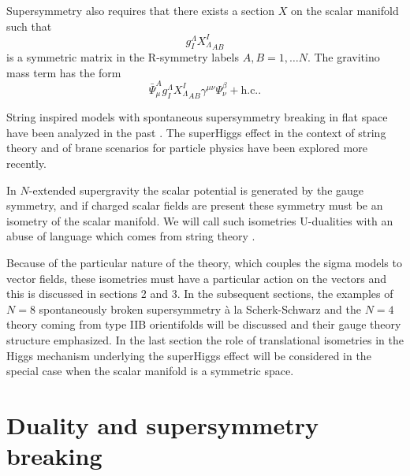 \documentclass[a4paper,12pt]{article}
\begin{document}
Supersymmetry also requires that there exists a section $X$ on the scalar manifold such that 
$$g_I^\Lambda{X^I_\Lambda
}_{AB}$$
is a symmetric matrix in the  R-symmetry labels $A, B=1,\dots N$. The gravitino mass term has the form 
$$\bar \Psi_\mu^Ag_I^\Lambda{X^I_\Lambda}_{AB}\gamma^{\mu\nu}\Psi_\nu^\beta +\mathrm{h.c.}.$$

String inspired models with spontaneous supersymmetry breaking in flat space \cite{ckvpdfwg} have been analyzed 
in the past \cite{fkpz}. The superHiggs effect in the context of string theory \cite{bkl} and of brane scenarios 
for particle physics \cite{mp} have been explored more recently. 

In $N$-extended supergravity the scalar potential is generated by the gauge symmetry, and if charged scalar 
fields are 
present these symmetry must be an isometry of the scalar manifold. We will call such isometries U-dualities 
with an 
abuse of language which comes from string theory \cite{ht}.

Because of the particular nature of the theory, which couples the sigma models to vector fields, these 
isometries must 
have a particular action on the vectors and this is discussed in sections 2 and 3. In the subsequent sections, 
the 
examples of $N=8$ spontaneously broken supersymmetry \`a la Scherk-Schwarz and the $N=4$ theory coming from 
type IIB 
orientifolds will be discussed and their gauge theory structure emphasized. In the last section the role of 
translational 
isometries in the Higgs mechanism underlying the superHiggs effect will be considered in the special case when 
the 
scalar manifold is a symmetric space.




\section{Duality and supersymmetry breaking}
\end{document}
